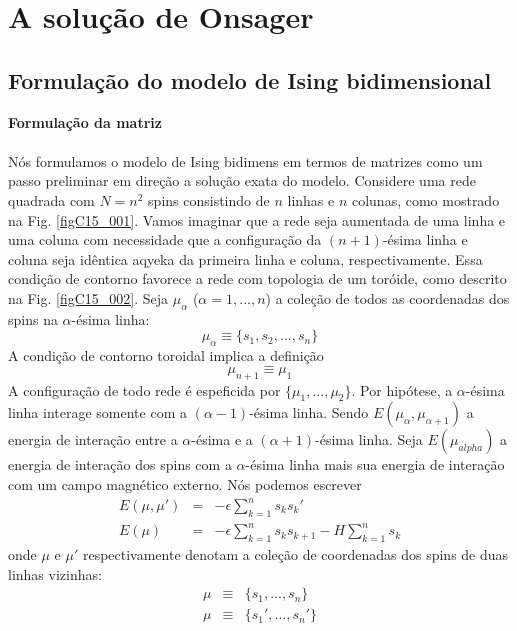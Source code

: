 \chapter{A solução de Onsager}
\noindent

\section{Formulação do modelo de Ising bidimensional}

{\bf Formulação da matriz}\\
\\
N\'os formulamos o modelo de Ising bidimens em termos de matrizes como um passo preliminar em dire\c{c}\~ao a solu\c{c}\~ao exata do modelo. Considere uma rede quadrada com $N=n^{2}$ spins consistindo de $n$ linhas e $n$ colunas, como mostrado na Fig. \ref{figC15_001}. Vamos imaginar que a rede seja aumentada de uma linha e uma coluna com necessidade que a configura\c{c}\~ao da $(n+1)$-\'esima linha e coluna seja id\^entica aqyeka da primeira linha e coluna, respectivamente. Essa condi\c{c}\~ao de contorno favorece a rede com topologia de um tor\'oide, como descrito na Fig. \ref{figC15_002}. Seja $\mu_{\alpha}$ ($\alpha=1,...,n$) a cole\c{c}\~ao de todos as coordenadas dos spins na $\alpha$-\'esima linha:
\begin{equation}
\mu_{\alpha}\equiv\{s_{1},s_{2},...,s_{n}\}
\end{equation}
A condi\c{c}\~ao de contorno toroidal implica a defini\c{c}\~ao
\begin{equation}
\mu_{n+1}\equiv\mu_{1}
\end{equation}
A configura\c{c}\~ao de todo rede \'e espeficida por $\{\mu_{1},...,\mu_{2}\}$. Por hip\'otese, a $\alpha$-\'esima linha interage somente com a $(\alpha-1)$-\'esima linha. Sendo $E(\mu_{\alpha},\mu_{\alpha+1})$ a energia de intera\c{c}\~ao entre a $\alpha$-\'esima e a $(\alpha+1)$-\'esima linha. Seja $E(\mu_{alpha})$ a energia de intera\c{c}\~ao dos spins com a $\alpha$-\'esima linha mais sua energia de intera\c{c}\~ao com um campo magn\'etico externo. N\'os podemos escrever
\begin{eqnarray}
E(\mu,\mu')&=&-\epsilon \sum_{k=1}^{n} s_{k} s_{k}'
\nonumber
\\
E(\mu)&=&-\epsilon \sum_{k=1}^{n} s_{k} s_{k+1}-H \sum_{k=1}^{n} s_{k}
\end{eqnarray}
onde $\mu$ e $\mu'$ respectivamente denotam a cole\c{c}\~ao de coordenadas dos spins de duas linhas vizinhas:
\begin{eqnarray}
\mu&\equiv&\{s_{1},...,s_{n}\}
\nonumber
\\
\mu&\equiv&\{s_{1}',...,s_{n}'\}
\end{eqnarray}
